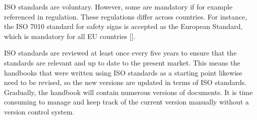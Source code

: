 ISO standards are voluntary. However, some are mandatory if for example referenced in regulation. These regulations differ across countries. For instance, the ISO 7010 standard for safety signs is accepted as the European Standard, which is mandatory for all EU countries [].

ISO standards are reviewed at least once every five years to ensure that the standards are relevant and up to date to the present market. This means the handbooks that were written using ISO standards as a starting point likewise need to be revised, so the new versions are updated in terms of ISO standards. Gradually, the handbook will contain numerous versions of documents. It is time consuming to manage and keep track of the current version manually without a version control system. 

